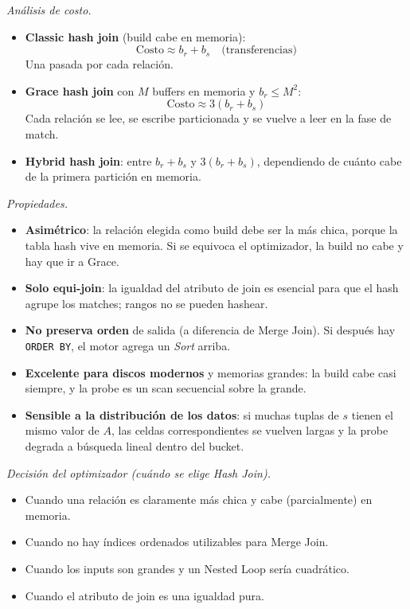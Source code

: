 \documentclass[11pt,a4paper]{article}
\begin{document}
\textit{Análisis de costo.}

\begin{itemize}
    \item \textbf{Classic hash join} (build cabe en memoria):
    \[
    \text{Costo} \approx b_r + b_s \quad \text{(transferencias)}
    \]
    Una pasada por cada relación.
    \item \textbf{Grace hash join} con $M$ buffers en memoria y $b_r \le M^2$:
    \[
    \text{Costo} \approx 3(b_r + b_s)
    \]
    Cada relación se lee, se escribe particionada y se vuelve a leer en la fase de match.
    \item \textbf{Hybrid hash join}: entre $b_r + b_s$ y $3(b_r + b_s)$, dependiendo de cuánto cabe de la primera partición en memoria.
\end{itemize}

\textit{Propiedades.}

\begin{itemize}
    \item \textbf{Asimétrico}: la relación elegida como build debe ser la más chica, porque la tabla hash vive en memoria. Si se equivoca el optimizador, la build no cabe y hay que ir a Grace.
    \item \textbf{Solo equi-join}: la igualdad del atributo de join es esencial para que el hash agrupe los matches; rangos no se pueden hashear.
    \item \textbf{No preserva orden} de salida (a diferencia de Merge Join). Si después hay \texttt{ORDER BY}, el motor agrega un \emph{Sort} arriba.
    \item \textbf{Excelente para discos modernos} y memorias grandes: la build cabe casi siempre, y la probe es un scan secuencial sobre la grande.
    \item \textbf{Sensible a la distribución de los datos}: si muchas tuplas de $s$ tienen el mismo valor de $A$, las celdas correspondientes se vuelven largas y la probe degrada a búsqueda lineal dentro del bucket.
\end{itemize}

\textit{Decisión del optimizador (cuándo se elige Hash Join).}

\begin{itemize}
    \item Cuando una relación es claramente más chica y cabe (parcialmente) en memoria.
    \item Cuando no hay índices ordenados utilizables para Merge Join.
    \item Cuando los inputs son grandes y un Nested Loop sería cuadrático.
    \item Cuando el atributo de join es una igualdad pura.
\end{itemize}
\end{document}
